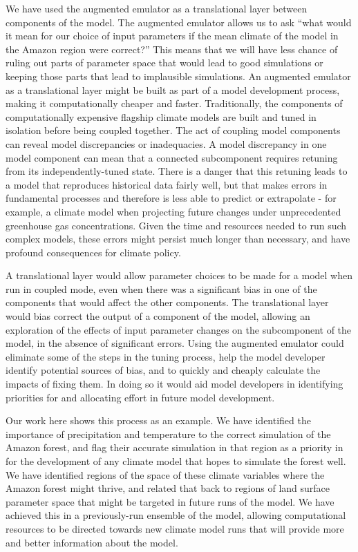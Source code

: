 \documentclass[gmd, manuscript]{copernicus}
\begin{document}
We have used the augmented emulator as a translational layer between components of the model. The augmented emulator allows us to ask ``what would it mean for our choice of input parameters if the mean climate of the model in the Amazon region were correct?'' This means that we will have less chance of ruling out parts of parameter space that would lead to good simulations or keeping those parts that lead to implausible simulations. An augmented emulator as a translational layer might be built as part of a model development process, making it computationally cheaper and faster. Traditionally, the components of computationally expensive flagship climate models are built and tuned in isolation before being coupled together. The act of coupling model components can reveal model discrepancies or inadequacies. A model discrepancy in one model component can mean that a connected subcomponent requires retuning from its independently-tuned state. There is a danger that this retuning leads to a model that reproduces historical data fairly well, but that makes errors in fundamental processes and therefore is less able to predict or extrapolate - for example, a climate model when projecting future changes under unprecedented greenhouse gas concentrations. Given the time and resources needed to run such complex models, these errors might persist much longer than necessary, and have profound consequences for climate policy. 

A translational layer would allow parameter choices to be made for a model when run in coupled mode, even when there was a significant bias in one of the components that would affect the other components. The translational layer would bias correct the output of a component of the model, allowing an exploration of the effects of input parameter changes on the subcomponent of the model, in the absence of significant errors. Using the augmented emulator could eliminate some of the steps in the tuning process, help the model developer identify potential sources of bias, and to quickly and cheaply calculate the impacts of fixing them. In doing so it would aid model developers in identifying priorities for and allocating effort in future model development.

Our work here shows this process as an example. We have identified the importance of precipitation and temperature to the correct simulation of the Amazon forest, and flag their accurate simulation in that region as a priority in for the development of any climate model that hopes to simulate the forest well. We have identified regions of the space of these climate variables where the Amazon forest might thrive, and related that back to regions of land surface parameter space that might be targeted in future runs of the model. We have achieved this in a previously-run ensemble of the model, allowing computational resources to be directed towards new climate model runs that will provide more and better information about the model.
\end{document}

